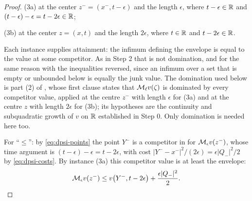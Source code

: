 \begin{proof}
(3a) at the center $z^-=(x^-,t-\epsilon)$ and the length $\epsilon$, where
$t-\epsilon\in\mathbb{R}$ and $(t-\epsilon)-\epsilon=t-2\epsilon\in\mathbb{R}$;

(3b) at the center $z=(x,t)$ and the length $2\epsilon$, where $t\in\mathbb{R}$ and
$t-2\epsilon\in\mathbb{R}$.

Each instance supplies attainment: the infimum defining the envelope is equal to
the value at some competitor. As in Step 2 that is not domination, and for the
same reason with the inequalities reversed, since an infimum over a set that is
empty or unbounded below is equally the junk value. The domination used below is
part (2) of , whose first clause states that
$\mathcal{M}_\ell v(\zeta)$ is dominated by every competitor value, applied at the
centre $z^-$ with length $\epsilon$ for (3a) and at the centre $z$ with length
$2\epsilon$ for (3b); its hypotheses are the continuity and subquadratic growth
of $v$ on $\mathbb{R}$ established in Step 0. Only domination is needed here too.

For ``$\le$'': by \eqref{eq:dpsi-points} the point $Y^-$ is a competitor in
 for $\mathcal{M}_\epsilon v(z^-)$, whose time argument is
$(t-\epsilon)-\epsilon=t-2\epsilon$, with cost
$|Y^--x^-|^2/(2\epsilon)=\epsilon|Q_-|^2/2$ by \eqref{eq:dpsi-costs}. By
instance (3a) this competitor value is at least the envelope:
\begin{equation}\label{eq:dpsi-bwd-le}
  \mathcal{M}_\epsilon v(z^-)\le v\bigl(Y^-,t-2\epsilon\bigr)
    +\frac{\epsilon|Q_-|^2}{2}.
\end{equation}


\end{proof}
